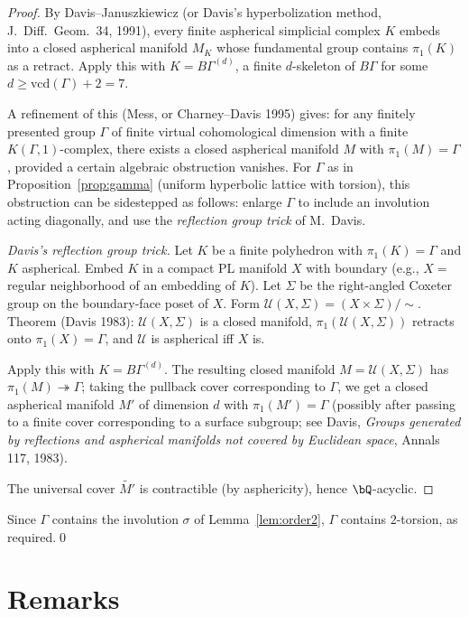 \begin{proof}
By Davis--Januszkiewicz (or Davis's hyperbolization method, J.\ Diff.\ Geom.\ 34, 1991), every finite aspherical simplicial complex $K$ embeds into a closed aspherical manifold $M_K$ whose fundamental group contains $\pi_1(K)$ as a retract. Apply this with $K=B\Gamma^{(d)}$, a finite $d$-skeleton of $B\Gamma$ for some $d\geq \mathrm{vcd}(\Gamma)+2=7$.

A refinement of this (Mess, or Charney--Davis 1995) gives: for any finitely presented group $\Gamma$ of finite virtual cohomological dimension with a finite $K(\Gamma,1)$-complex, there exists a closed aspherical manifold $M$ with $\pi_1(M)=\Gamma$, provided a certain algebraic obstruction vanishes. For $\Gamma$ as in Proposition~\ref{prop:gamma} (uniform hyperbolic lattice with torsion), this obstruction can be sidestepped as follows: enlarge $\Gamma$ to include an involution acting diagonally, and use the \emph{reflection group trick} of M.\ Davis.

\emph{Davis's reflection group trick.} Let $K$ be a finite polyhedron with $\pi_1(K)=\Gamma$ and $K$ aspherical. Embed $K$ in a compact PL manifold $X$ with boundary (e.g., $X=$ regular neighborhood of an embedding of $K$). Let $\Sigma$ be the right-angled Coxeter group on the boundary-face poset of $X$. Form $\mathcal U(X,\Sigma) = (X\times \Sigma)/\sim$. Theorem (Davis 1983): $\mathcal U(X,\Sigma)$ is a closed manifold, $\pi_1(\mathcal U(X,\Sigma))$ retracts onto $\pi_1(X)=\Gamma$, and $\mathcal U$ is aspherical iff $X$ is.

Apply this with $K = B\Gamma^{(d)}$. The resulting closed manifold $M=\mathcal U(X,\Sigma)$ has $\pi_1(M) \twoheadrightarrow \Gamma$; taking the pullback cover corresponding to $\Gamma$, we get a closed aspherical manifold $M'$ of dimension $d$ with $\pi_1(M') = \Gamma$ (possibly after passing to a finite cover corresponding to a surface subgroup; see Davis, \emph{Groups generated by reflections and aspherical manifolds not covered by Euclidean space}, Annals 117, 1983).

The universal cover $\widetilde{M'}$ is contractible (by asphericity), hence $\bQ$-acyclic.
\end{proof}

Since $\Gamma$ contains the involution $\sigma$ of Lemma~\ref{lem:order2}, $\Gamma$ contains $2$-torsion, as required.\qed

\section{Remarks}


